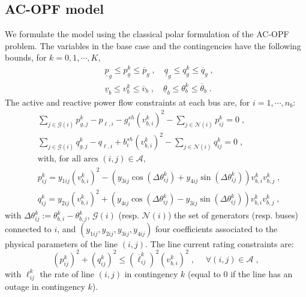 \documentclass{IEEEtran4PSCC}
\newcommand{\add}[1]{#1}
\begin{document}
\subsection{AC-OPF model}
We formulate the model using the classical polar formulation of the AC-OPF problem.
The variables in the base case and the contingencies have the following bounds,
for $k=0, 1,\cdots, K$,
\begin{equation}
  \begin{aligned}
  & \underline{p}_g \leq p_g^k \leq \overline{p}_g \; , \quad
  \underline{q}_g \leq q_g^k \leq \overline{q}_g \; , \\
  & \underline{v}_b \leq v_b^k \leq \overline{v}_b \; , \quad
  \underline{\theta}_b \leq \theta_b^k \leq \overline{\theta}_b \; .
  \end{aligned}
\end{equation}
\add{The active and reactive power flow constraints at each bus are,
for $i=1, \cdots, n_b$:
\begin{equation*}
  \begin{aligned}
    & \sum_{j \in \mathcal{G}(i)} p_{g,j}^k - p_{\ell,i} - g_i^{sh} (v_{b,i}^k)^2 - \sum_{j \in \mathcal{N}(i)} p_{ij}^k = 0 \; , \\
    & \sum_{j \in \mathcal{G}(i)} q_{g,j}^k - q_{\ell,i} + b_i^{sh} (v_{b,i}^k)^2 - \sum_{j \in \mathcal{N}(i)} q_{ij}^k = 0 \; ,\\
    & \text{with, for all arcs $(i, j) \in \mathcal{A}$}, \\
    & p_{ij}^k = y_{1ij} (v_{b,i}^k)^2 - (y_{3ij} \cos(\Delta\theta_{ij}^k) + y_{4ij} \sin(\Delta\theta_{ij}^k))v_{b,i}^k v_{b,j}^k \;,  \\
    & q_{ij}^k = y_{2ij} (v_{b,i}^k)^2 + (y_{4ij} \cos(\Delta\theta_{ij}^k) - y_{3ij} \sin(\Delta\theta_{ij}^k)) v_{b,i}^k v_{b,j}^k\; ,
  \end{aligned}
\end{equation*}
with $\Delta\theta_{ij}^k := \theta_{b,i}^k - \theta_{b,j}^k$,
$\mathcal{G}(i)$ (resp. $\mathcal{N}(i)$) the set of generators (resp. buses) connected to $i$,
and $(y_{1ij}, y_{2ij}, y_{3ij}, y_{4ij})$ four coefficients associated to the physical
parameters of the line $(i,j)$. The line current rating constraints are:
\begin{equation*}
  (p_{ij}^k)^2 + (q_{ij}^k)^2 \leq (\overline{\ell}_{ij}^k)^2 (v_{b,i}^k)^2 \; , \;
  \quad \forall (i, j) \in \mathcal{A} \; ,
\end{equation*}
with $\ell_{ij}^k$ the rate of line $(i, j)$ in contingency $k$ (equal to $0$ if the
line has an outage in contingency $k$).}
\end{document}

